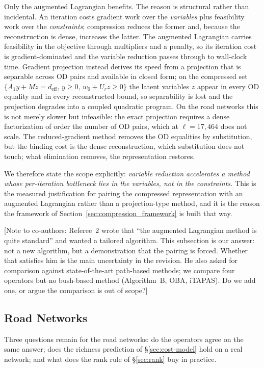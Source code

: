 \documentclass[11pt]{article}
\newcommand{\conote}[1]{{\color{red}\small\textsf{[Note to co-authors: #1]}}}
\begin{document}
Only the augmented Lagrangian benefits. The reason is structural rather than incidental. An
iteration costs gradient work over the \emph{variables} plus feasibility work over the
\emph{constraints}; compression reduces the former and, because the reconstruction is dense,
increases the latter. The augmented Lagrangian carries feasibility in the objective through
multipliers and a penalty, so its iteration cost is gradient-dominated and the variable
reduction passes through to wall-clock time. Gradient projection instead derives its speed
from a projection that is separable across OD pairs and available in closed form; on the
compressed set $\{A_1y+Mz=d_{\mathrm{eff}},\,y\ge0,\,w_0+U_rz\ge0\}$ the latent variables
$z$ appear in every OD equality and in every reconstructed bound, so separability is lost and
the projection degrades into a coupled quadratic program. On the road networks this is not
merely slower but infeasible: the exact projection requires a dense factorization of order
the number of OD pairs, which at $\ell=17{,}464$ does not scale. The reduced-gradient method
removes the OD equalities by substitution, but the binding cost is the dense reconstruction,
which substitution does not touch; what elimination removes, the representation restores.

We therefore state the scope explicitly: \emph{variable reduction accelerates a method whose
per-iteration bottleneck lies in the variables, not in the constraints.} This is the
measured justification for pairing the compressed representation with an augmented Lagrangian
rather than a projection-type method, and it is the reason the framework of
Section~\ref{sec:compression_framework} is built that way.

\conote{Referee~2 wrote that ``the augmented Lagrangian method is quite standard'' and wanted
a tailored algorithm. This subsection is our answer: not a new algorithm, but a demonstration
that the pairing is forced. Whether that satisfies him is the main uncertainty in the
revision. He also asked for comparison against state-of-the-art path-based methods; we compare
four operators but no bush-based method (Algorithm~B, OBA, iTAPAS). Do we add one, or argue
the comparison is out of scope?}


\subsection{Road Networks}
\label{sec:road-networks}


Three questions remain for the road networks: do the operators agree on the same answer; does
the richness prediction of \S\ref{sec:cost-model} hold on a real network; and what does the
rank rule of \S\ref{sec:rank} buy in practice.
\end{document}
